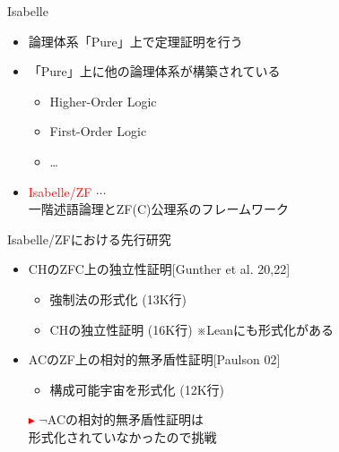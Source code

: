 \documentclass[17pt,aspectratio=169]{beamer}
\begin{document}
\begin{frame}{Isabelle}
    \begin{itemize}
        \item 論理体系「Pure」上で定理証明を行う
        \item 「Pure」上に他の論理体系が構築されている
              {\small \begin{itemize}
                  \item Higher-Order Logic
                  \item First-Order Logic \\
                  \item \dots
              \end{itemize} }
              \vspace{-10pt}
        \item \textcolor{red}{Isabelle/ZF} $\cdots$ \\ 
        一階述語論理とZF(C)公理系のフレームワーク
    \end{itemize}
\end{frame}



\begin{frame}{Isabelle/ZFにおける先行研究}
 
    \begin{itemize}[itemsep=8pt]
        \vspace{10pt}
        \item CHのZFC上の独立性証明{\small [Gunther et al. 20,22]}
            \vspace{3pt}
              {\small \begin{itemize}
                \item 強制法の形式化 (13K行)
                \item CHの独立性証明 (16K行) ※Leanにも形式化がある
              \end{itemize} }

        \item ACのZF上の相対的無矛盾性証明{\small [Paulson 02]}
              {\small \begin{itemize}
                      \item 構成可能宇宙を形式化 (12K行)
                  \end{itemize} }
    \end{itemize}
    \begin{itemize}
        \item [\textcolor{red}{$\blacktriangleright$}] $\neg$ACの相対的無矛盾性証明は\\
        形式化されていなかったので挑戦
    \end{itemize}
\end{frame}
\end{document}
